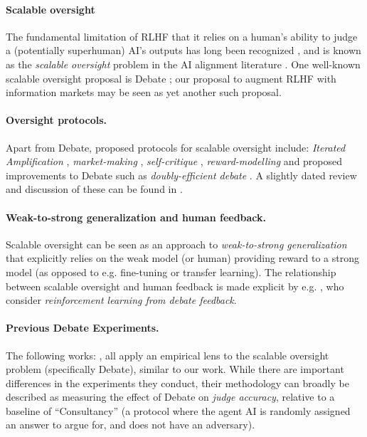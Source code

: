 \paragraph{Scalable oversight} The fundamental limitation of RLHF that it relies on a human's ability to judge a (potentially superhuman) AI's outputs has long been recognized , and is known as the \emph{scalable oversight} problem in the AI alignment literature . One well-known scalable oversight proposal is Debate ; our proposal to augment RLHF with information markets may be seen as yet another such proposal.
\paragraph{Oversight protocols.} Apart from Debate, proposed protocols for scalable oversight include: \emph{Iterated Amplification} \citep{christiano2018IDA}, \emph{market-making} \citep{evanhubingerAISafetyMarket2020}, \emph{self-critique} \citep{saunders2022selfcritique}, \emph{reward-modelling} \citep{leike2018RewardModeling} and proposed improvements to Debate such as \emph{doubly-efficient debate} \citep{brown-cohenScalableAISafety2023}. A slightly dated review and discussion of these can be found in \citet{bowmanMeasuringProgressScalable2022}. 

\paragraph{Weak-to-strong generalization and human feedback.} Scalable oversight can be seen as an approach to \emph{weak-to-strong generalization} \citep{sangWeak2Strong, langWeak2Strong} that explicitly relies on the weak model (or human) providing reward to a strong model (as opposed to e.g. fine-tuning or transfer learning). The relationship between scalable oversight and human feedback is made explicit by e.g. \citet{cheng2024RLHFDebate}, who consider \emph{reinforcement learning from debate feedback}.

\paragraph{Previous Debate Experiments.} The following works: \allpreviousworks, all apply an empirical lens to the scalable oversight problem (specifically Debate), similar to our work. While there are important differences in the experiments they conduct, their methodology can broadly be described as measuring the effect of Debate on \emph{judge accuracy}, relative to a baseline of ``Consultancy'' (a protocol where the agent AI is randomly assigned an answer to argue for, and does not have an adversary). %

